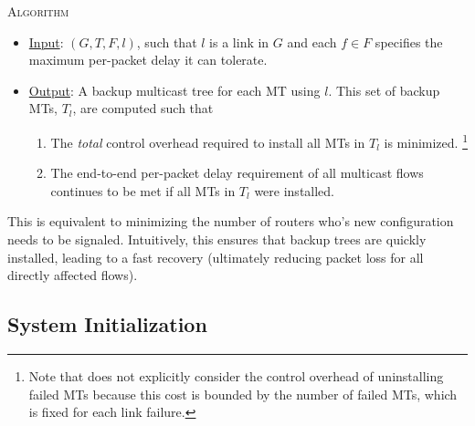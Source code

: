 \mc \textsc{Algorithm}
\begin{itemize}

	\item  \underline{Input}: $(G,T,F,l)$, such that $l$ is a link in $G$ and each $f \in F$ specifies the maximum per-packet delay it can tolerate.

	\item \underline{Output}: 	A backup multicast tree for each MT using $l$. This set of backup MTs, $T_l$, are computed such that 
	
	\begin{enumerate}
			
		\item The \emph{total} control overhead required to install all MTs in $T_l$ is minimized.
	\footnote{Note that \mc does not explicitly consider the control overhead of uninstalling failed MTs because this cost is bounded by the number of failed MTs, which is fixed for each link failure.}
			
			\item The end-to-end per-packet delay requirement of all multicast flows continues to be met if all MTs in $T_l$ were installed. 
		\end{enumerate}



\end{itemize}
This is equivalent to minimizing the number of routers who's new configuration needs to be signaled.
Intuitively, this ensures that backup trees are quickly installed, leading to a fast recovery (ultimately reducing packet loss for all directly affected flows).  


\subsection{System Initialization}

\begin{framed}
\end{framed}

